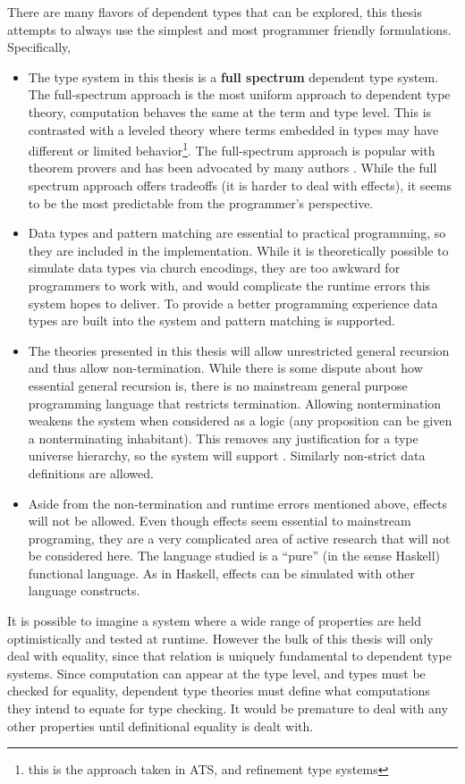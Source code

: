 There are many flavors of dependent types that can be explored, this thesis attempts to always use the simplest and most programmer friendly formulations.
Specifically,
\begin{itemize}
\item The type system in this thesis is a \textbf{full spectrum} dependent type system.
The full-spectrum approach is the most uniform approach to dependent type theory, computation behaves the same at the term and type level.
This is contrasted with a leveled theory where terms embedded in types may have different or limited behavior\footnote{this is the approach taken in ATS, and refinement type systems}.
The full-spectrum approach is popular with theorem provers and has been advocated by many authors \cite{10.1145/289423.289451,norell2007towards,brady2013idris,sjoberg2012irrelevance}.
While the full spectrum approach offers tradeoffs (it is harder to deal with effects), it seems to be the most predictable from the programmer's perspective.
\item Data types and pattern matching are essential to practical programming, so they are included in the implementation.
While it is theoretically possible to simulate data types via church encodings, they are too awkward for programmers to work with, and would complicate the runtime errors this system hopes to deliver.
To provide a better programming experience data types are built into the system and pattern matching is supported.
\item The theories presented in this thesis will allow unrestricted general recursion and thus allow non-termination.
While there is some dispute about how essential general recursion is,
there is no mainstream general purpose programming language that restricts termination.
Allowing nontermination weakens the system when considered as a logic (any proposition can be given a nonterminating inhabitant).
This removes any justification for a type universe hierarchy, so the system will support \tit.
Similarly non-strict data definitions are allowed.
\item Aside from the non-termination and runtime errors mentioned above, effects will not be allowed.
Even though effects seem essential to mainstream programing, they are a very complicated area of active research that will not be considered here.
The language studied is a ``pure'' (in the sense  Haskell) functional language.
As in Haskell, effects can be simulated with other language constructs.
\end{itemize}
It is possible to imagine a system where a wide range of properties are held optimistically and tested at runtime.
However the bulk of this thesis will only deal with equality, since that relation is uniquely fundamental to dependent type systems.
Since computation can appear at the type level, and types must be checked for equality, dependent type theories must define what computations they intend to equate for type checking.
It would be premature to deal with any other properties until definitional equality is dealt with.

